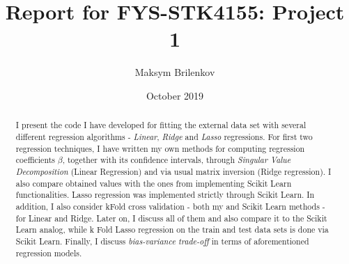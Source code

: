 \documentclass[paper=a4, fontsize=12pt, svgnames]{scrartcl}
\title{Report for FYS-STK4155: Project 1}
\author{Maksym Brilenkov}
\date{October 2019}
\numberwithin{equation}{section}		%
\numberwithin{figure}{section}			%
\numberwithin{table}{section}				%
\begin{document}



\maketitle

\begin{abstract}
    
    I present the code I have developed for fitting the external data set with several different regression algorithms - \textit{Linear}, \textit{Ridge} and \textit{Lasso} regressions. For first two regression techniques, I have written my own methods for computing regression coefficients $\beta$, together with its confidence intervals, through \textit{Singular Value Decomposition} (Linear Regression) and via usual matrix inversion (Ridge regression). I also compare obtained values with the ones from implementing Scikit Learn functionalities. Lasso regression was implemented strictly through Scikit Learn. In addition, I also consider kFold cross validation - both my and Scikit Learn methods - for Linear and Ridge. Later on, I discuss all of them and also compare it to the Scikit Learn analog, while k Fold Lasso regression on the train and test data sets is done via Scikit Learn. Finally, I discuss \textit{bias-variance trade-off} in terms of aforementioned regression models.
\end{abstract}














\end{document}
